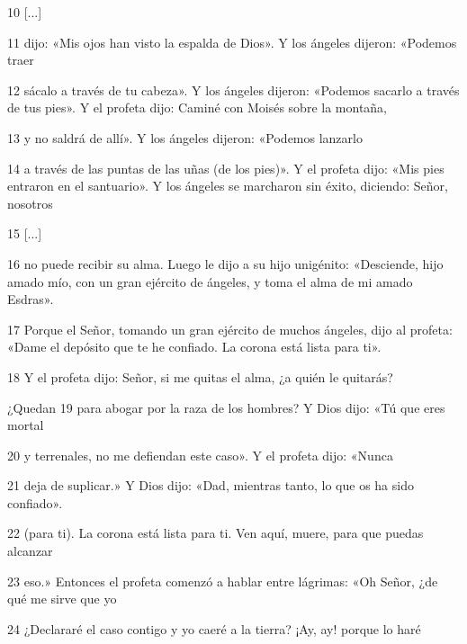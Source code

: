 \par 10 [...]

\par 11 dijo: «Mis ojos han visto la espalda de Dios». Y los ángeles dijeron: «Podemos traer

\par 12 sácalo a través de tu cabeza». Y los ángeles dijeron: «Podemos sacarlo a través de tus pies». Y el profeta dijo: Caminé con Moisés sobre la montaña,

\par 13 y no saldrá de allí». Y los ángeles dijeron: «Podemos lanzarlo

\par 14 a través de las puntas de las uñas (de los pies)». Y el profeta dijo: «Mis pies entraron en el santuario». Y los ángeles se marcharon sin éxito, diciendo: Señor, nosotros

\par 15 [...]

\par 16 no puede recibir su alma. Luego le dijo a su hijo unigénito: «Desciende, hijo amado mío, con un gran ejército de ángeles, y toma el alma de mi amado Esdras».

\par 17 Porque el Señor, tomando un gran ejército de muchos ángeles, dijo al profeta: «Dame el depósito que te he confiado. La corona está lista para ti».

\par 18 Y el profeta dijo: Señor, si me quitas el alma, ¿a quién le quitarás?

¿Quedan 19 para abogar por la raza de los hombres? Y Dios dijo: «Tú que eres mortal

\par 20 y terrenales, no me defiendan este caso». Y el profeta dijo: «Nunca

\par 21 deja de suplicar.» Y Dios dijo: «Dad, mientras tanto, lo que os ha sido confiado».

\par 22 (para ti). La corona está lista para ti. Ven aquí, muere, para que puedas alcanzar

\par 23 eso.» Entonces el profeta comenzó a hablar entre lágrimas: «Oh Señor, ¿de qué me sirve que yo

\par 24 ¿Declararé el caso contigo y yo caeré a la tierra? ¡Ay, ay! porque lo haré

